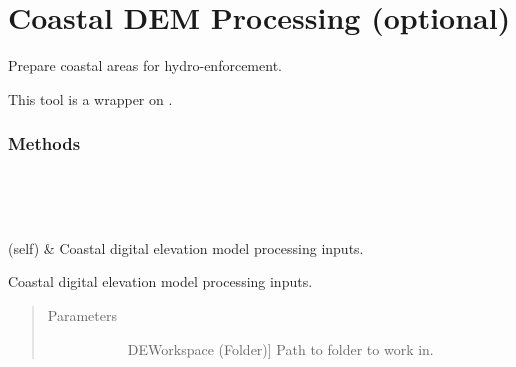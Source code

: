 \documentclass[letterpaper,10pt,english]{sphinxmanual}
\begin{document}
\section{Coastal DEM Processing (optional)}
\label{\detokenize{StreamStats_DataPrep:coastal-dem-processing-optional}}

\begin{fulllineitems}
\label{\detokenize{StreamStats_DataPrep:StreamStats_DataPrep.CoastalDEM}}
Prepare coastal areas for hydro-enforcement.

This tool is a wrapper on {\hyperref[\detokenize{make_hydrodem:make_hydrodem.coastaldem}]{}}.
\subsubsection*{Methods}


\begin{savenotes}\sphinxatlongtablestart\begin{longtable}{}
\hline

\endfirsthead

%
{}\\
\hline

\endhead

\hline
{}\\
\endfoot

\endlastfoot

{\hyperref[\detokenize{StreamStats_DataPrep:StreamStats_DataPrep.CoastalDEM.getParameterInfo}]{}}(self)
&
Coastal digital elevation model processing inputs.
\\
\hline
\end{longtable}\sphinxatlongtableend\end{savenotes}

\begin{fulllineitems}
\label{\detokenize{StreamStats_DataPrep:StreamStats_DataPrep.CoastalDEM.getParameterInfo}}
Coastal digital elevation model processing inputs.
\begin{quote}\begin{description}
\item[{Parameters}] \leavevmode\begin{description}
\item[{}] \leavevmode{[}DEWorkspace (Folder){]}
Path to folder to work in.


\end{description}
\end{description}
\end{quote}
\end{fulllineitems}
\end{fulllineitems}
\end{document}
